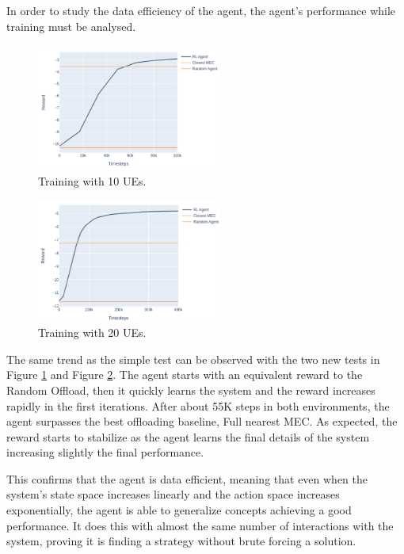 In order to study the data efficiency of the agent, the agent's performance while training must be analysed.


\begin{minipage}{0.5\textwidth}
\begin{figure}[H]
  \centering
  \includegraphics[width=230px]{images/5_10_training.png}
  \caption{Training with 10 \acrshort{UE}s.}  \label{5_10_training}
\end{figure}
\end{minipage}
\begin{minipage}{0.5\textwidth}
\begin{figure}[H]
  \centering
  \includegraphics[width=230px]{images/5_20_training.png}
  \caption{Training with 20 \acrshort{UE}s.}  \label{5_20_training}
\end{figure}
\end{minipage}

\hfill \break
The same trend as the simple test can be observed with the two new tests in Figure \ref{5_10_training} and Figure \ref{5_20_training}. The agent starts with an equivalent reward to the Random Offload, then it quickly learns the system and the reward increases rapidly in the first iterations. After about 55K steps in both environments, the agent surpasses the best offloading baseline, Full nearest MEC. As expected, the reward starts to stabilize as the agent learns the final details of the system increasing slightly the final performance.

This confirms that the agent is data efficient, meaning that even when the system's state space increases linearly and the action space increases exponentially, the agent is able to generalize concepts achieving a good performance. It does this with almost the same number of interactions with the system, proving it is finding a strategy without brute forcing a solution.

